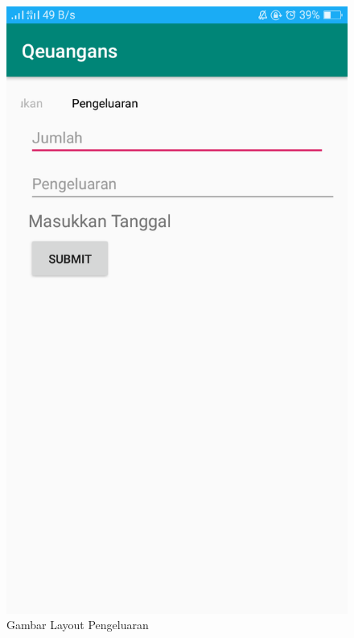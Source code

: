 \begin{figure}[]
    \includegraphics[scale = 0.3]{pictures/pengeluaran_layout.png}
    \caption{Gambar Layout Pengeluaran}
    \label{layout_pengeluaran}
\end{figure}

